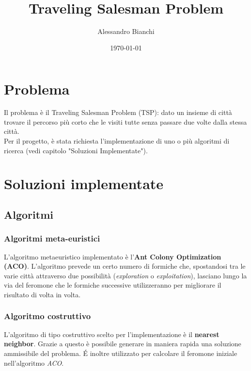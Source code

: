 \documentclass[a4paper,11pt,oneside]{DTI}
\title{Traveling Salesman Problem}
\author{Alessandro Bianchi}
\date{\today}
\begin{document}
\maketitle
\frontmatter
\newpage
\mainmatter

%

\chapter*{Problema}
\label{cha_problema}

Il problema è il Traveling Salesman Problem (TSP): dato un insieme di città trovare il percorso più corto che le visiti tutte senza passare due volte dalla stessa città.\\

Per il progetto, è stata richiesta l'implementazione di uno o più algoritmi di ricerca (vedi capitolo "Soluzioni Implementate").

%
\chapter*{Soluzioni implementate}
\label{cha_soluzioni}

\section*{Algoritmi}
\subsection*{Algoritmi meta-euristici}
\label{sec_metaeuristici}
L'algoritmo metaeuristico implementato è l'\textbf{Ant Colony Optimization (ACO)}. L'algoritmo prevede un certo numero di formiche che, spostandosi tra le varie città attraverso due possibilità (\textit{exploration} o \textit{exploitation}), lasciano lungo la via del feromone che le formiche successive utilizzeranno per migliorare il risultato di volta in volta.

\subsection*{Algoritmo costruttivo}
\label{sec_costruttivo}

L'algoritmo di tipo costruttivo scelto per l'implementazione è il \textbf{nearest neighbor}. Grazie a questo è possibile generare in maniera rapida una soluzione ammissibile del problema. \'E inoltre utilizzato per calcolare il feromone iniziale nell'algoritmo \textit{ACO}.
\end{document}
